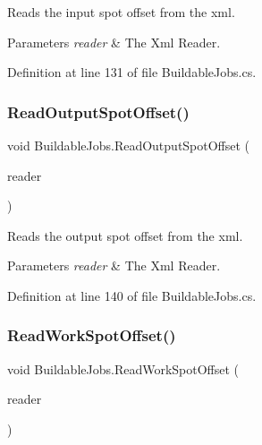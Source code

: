 Reads the input spot offset from the xml. 


\begin{DoxyParams}{Parameters}
{\em reader} & The Xml Reader.\\
\hline
\end{DoxyParams}


Definition at line 131 of file Buildable\+Jobs.\+cs.

\mbox{\label{class_buildable_jobs_a555d096b725e42460648535bfc9bec63}} 
\subsubsection{\texorpdfstring{Read\+Output\+Spot\+Offset()}{ReadOutputSpotOffset()}}
{\footnotesize\ttfamily void Buildable\+Jobs.\+Read\+Output\+Spot\+Offset (\begin{DoxyParamCaption}\item[{Xml\+Reader}]{reader }\end{DoxyParamCaption})}



Reads the output spot offset from the xml. 


\begin{DoxyParams}{Parameters}
{\em reader} & The Xml Reader.\\
\hline
\end{DoxyParams}


Definition at line 140 of file Buildable\+Jobs.\+cs.

\mbox{\label{class_buildable_jobs_a1d1403862cca825858202843fbee4b74}} 
\subsubsection{\texorpdfstring{Read\+Work\+Spot\+Offset()}{ReadWorkSpotOffset()}}
{\footnotesize\ttfamily void Buildable\+Jobs.\+Read\+Work\+Spot\+Offset (\begin{DoxyParamCaption}\item[{Xml\+Reader}]{reader }\end{DoxyParamCaption})}




